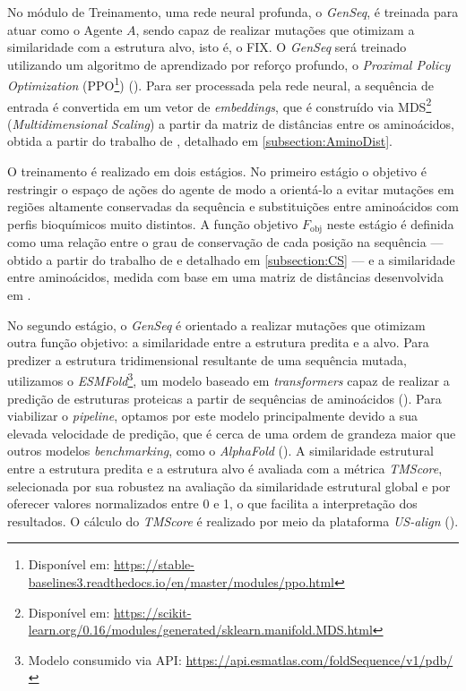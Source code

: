 No módulo de Treinamento, uma rede neural profunda, o \textit{GenSeq}, é treinada para atuar como o Agente $A$,
sendo capaz de realizar mutações que otimizam a similaridade com a estrutura alvo, isto é, o FIX.
O \textit{GenSeq} será treinado utilizando um algoritmo de aprendizado por reforço profundo, 
o \textit{Proximal Policy Optimization} (PPO\footnote{Disponível em: \url{https://stable-baselines3.readthedocs.io/en/master/modules/ppo.html}}) (\cite{PPO}).
Para ser processada pela rede neural, a sequência de entrada é convertida em um vetor de \textit{embeddings},
que é construído via MDS\footnote{Disponível em: \url{https://scikit-learn.org/0.16/modules/generated/sklearn.manifold.MDS.html}} (\textit{Multidimensional Scaling}) 
a partir da matriz de distâncias entre 
os aminoácidos, obtida a partir do trabalho de \cite{aminodist}, 
detalhado em \ref{subsection:AminoDist}.

O treinamento é realizado em dois estágios. No primeiro estágio o objetivo é restringir o espaço de ações do agente 
de modo a orientá-lo a evitar mutações em regiões altamente conservadas da sequência e 
substituições entre aminoácidos com perfis bioquímicos muito distintos. 
A função objetivo $F_{\text{obj}}$ neste estágio é definida como uma relação 
entre o grau de conservação de cada posição na sequência — obtido a partir do trabalho de \cite{CS} e detalhado em \ref{subsection:CS} — e a similaridade entre aminoácidos, 
medida com base em uma matriz de distâncias desenvolvida em \cite{aminodist}. 

No segundo estágio, o \textit{GenSeq} é orientado a realizar mutações que otimizam outra 
função objetivo: a similaridade entre a estrutura predita e a alvo. 
Para predizer a estrutura tridimensional resultante de uma sequência mutada,
utilizamos o \textit{ESMFold}\footnote{Modelo consumido via API: \url{https://api.esmatlas.com/foldSequence/v1/pdb/}},
um modelo baseado em \textit{transformers} capaz de realizar a predição de estruturas proteicas 
a partir de sequências de aminoácidos (\cite{ESMFold}). 
Para viabilizar o \textit{pipeline}, optamos por este modelo principalmente devido 
a sua elevada velocidade de predição, que é cerca de uma ordem de grandeza maior que 
outros modelos \textit{benchmarking}, como o \textit{AlphaFold} (\cite{ESMFold}).
A similaridade estrutural entre a estrutura predita e a estrutura alvo 
é avaliada com a métrica \textit{TMScore}, 
selecionada por sua robustez na avaliação da similaridade estrutural global 
e por oferecer valores normalizados entre 0 e 1, 
o que facilita a interpretação dos resultados. 
O cálculo do \textit{TMScore} é realizado por meio da plataforma \textit{US-align} (\cite{USalign}).

